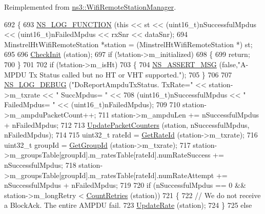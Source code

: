 Reimplemented from \hyperlink{classns3_1_1WifiRemoteStationManager_a25709c3fb16dbf9c07170a952d33415f}{ns3\+::\+Wifi\+Remote\+Station\+Manager}.


\begin{DoxyCode}
692 \{
693   \hyperlink{log-macros-disabled_8h_a90b90d5bad1f39cb1b64923ea94c0761}{NS\_LOG\_FUNCTION} (\textcolor{keyword}{this} << st << (uint16\_t)nSuccessfulMpdus << (uint16\_t)nFailedMpdus << 
      rxSnr << dataSnr);
694   MinstrelHtWifiRemoteStation *station = (MinstrelHtWifiRemoteStation *) st;
695 
696   \hyperlink{classns3_1_1MinstrelHtWifiManager_a7f94804a34efa6121bdfd5d01ac34694}{CheckInit} (station);
697   \textcolor{keywordflow}{if} (!station->m\_initialized)
698     \{
699       \textcolor{keywordflow}{return};
700     \}
701 
702   \textcolor{keywordflow}{if} (!station->m\_isHt)
703     \{
704       \hyperlink{assert_8h_aff5ece9066c74e681e74999856f08539}{NS\_ASSERT\_MSG} (\textcolor{keyword}{false},\textcolor{stringliteral}{"A-MPDU Tx Status called but no HT or VHT supported."});
705     \}
706 
707   \hyperlink{group__logging_ga413f1886406d49f59a6a0a89b77b4d0a}{NS\_LOG\_DEBUG} (\textcolor{stringliteral}{"DoReportAmpduTxStatus. TxRate="} << station->m\_txrate << \textcolor{stringliteral}{" SuccMpdus= "} <<
708                 (uint16\_t)nSuccessfulMpdus << \textcolor{stringliteral}{" FailedMpdus= "} << (uint16\_t)nFailedMpdus);
709 
710   station->m\_ampduPacketCount++;
711   station->m\_ampduLen += nSuccessfulMpdus + nFailedMpdus;
712 
713   \hyperlink{classns3_1_1MinstrelHtWifiManager_a7a73ce35e212586453fb9405c55654a5}{UpdatePacketCounters} (station, nSuccessfulMpdus, nFailedMpdus);
714 
715   uint32\_t rateId = \hyperlink{classns3_1_1MinstrelHtWifiManager_a6162341f1348bbe713d09642b09ac658}{GetRateId} (station->m\_txrate);
716   uint32\_t groupId = \hyperlink{classns3_1_1MinstrelHtWifiManager_a43157e6007b4b922043cb02a99ea6d1f}{GetGroupId} (station->m\_txrate);
717   station->m\_groupsTable[groupId].m\_ratesTable[rateId].numRateSuccess += nSuccessfulMpdus;
718   station->m\_groupsTable[groupId].m\_ratesTable[rateId].numRateAttempt += nSuccessfulMpdus + nFailedMpdus;
719 
720   \textcolor{keywordflow}{if} (nSuccessfulMpdus == 0 && station->m\_longRetry < \hyperlink{classns3_1_1MinstrelHtWifiManager_a049c7b034d4647393f6949467fbcb628}{CountRetries} (station))
721     \{
722       \textcolor{comment}{// We do not receive a BlockAck. The entire AMPDU fail.}
723       \hyperlink{classns3_1_1MinstrelHtWifiManager_abb282b56803faf26139d0db929b09b22}{UpdateRate} (station);
724     \}
725   \textcolor{keywordflow}{else}

\end{DoxyCode}
